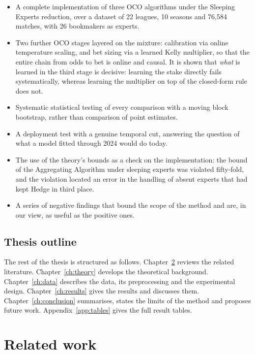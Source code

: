 \documentclass[12pt,a4paper,oneside]{report}
\renewcommand{\_}{\oldunderscore\allowbreak}
\theoremstyle{definition}
\theoremstyle{plain}
\theoremstyle{definition}   %
\begin{document}
\begin{itemize}
  \item A complete implementation of three OCO algorithms under the Sleeping Experts
        reduction, over a dataset of 22 leagues, 10 seasons and 76,584 matches, with 26
        bookmakers as experts.
  \item Two further OCO stages layered on the mixture: calibration via online temperature
        scaling, and bet sizing via a learned Kelly multiplier, so that the entire chain from
        odds to bet is online and causal. It is shown that \emph{what} is learned in the third
        stage is decisive: learning the stake directly fails systematically, whereas learning
        the multiplier on top of the closed-form rule does not.
  \item Systematic statistical testing of every comparison with a moving block bootstrap,
        rather than comparison of point estimates.
  \item A deployment test with a genuine temporal cut, answering the question of what a model
        fitted through 2024 would do today.
  \item The use of the theory's bounds as a check on the implementation: the bound of the
        Aggregating Algorithm under sleeping experts was violated fifty-fold, and the violation
        located an error in the handling of absent experts that had kept Hedge in third place.
  \item A series of negative findings that bound the scope of the method and are, in our view,
        as useful as the positive ones.
\end{itemize}

\section{Thesis outline}

The rest of the thesis is structured as follows. Chapter~\ref{ch:related} reviews the related literature. Chapter~\ref{ch:theory} develops the
theoretical background. Chapter~\ref{ch:data} describes the data, its preprocessing and the
experimental design. Chapter~\ref{ch:results} gives the results and discusses them.
Chapter~\ref{ch:conclusion} summarises, states the limits of the method and proposes future
work. Appendix~\ref{app:tables} gives the full result tables.

\chapter{Related work}
\label{ch:related}
\end{document}
